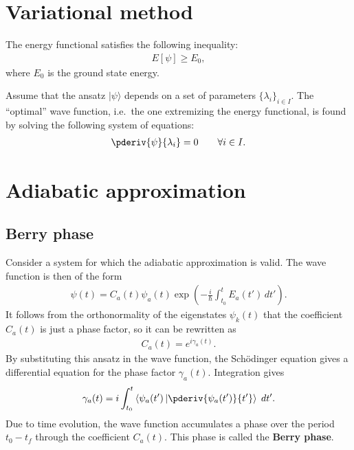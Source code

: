 \section{Variational method}


    \begin{property}
        The energy functional satisfies the following inequality:
        \begin{gather}
            E[\psi]\geq E_0,
        \end{gather}
        where $E_0$ is the ground state energy.
    \end{property}

    \begin{method}
        Assume that the ansatz $|\psi\rangle$ depends on a set of parameters $\{\lambda_i\}_{i\in I}$. The ``optimal'' wave function, i.e.~the one extremizing the energy functional, is found by solving the following system of equations:
        \begin{gather}
            \pderiv{\psi}{\lambda_i} = 0\qquad\forall i\in I.
        \end{gather}
    \end{method}

\section{Adiabatic approximation}
\subsection{Berry phase}

    Consider a system for which the adiabatic approximation is valid. The wave function is then of the form
    \begin{gather}
        \psi(t) = C_a(t)\psi_a(t)\exp\left(-\frac{i}{\hbar}\int_{t_0}^tE_a(t')\,dt'\right).
    \end{gather}
    It follows from the orthonormality of the eigenstates $\psi_k(t)$ that the coefficient $C_a(t)$ is just a phase factor, so it can be rewritten as
    \begin{gather}
        C_a(t) = e^{i\gamma_a(t)}.
    \end{gather}
    By substituting this ansatz in the wave function, the Sch\"odinger equation gives a differential equation for the phase factor $\gamma_a(t)$. Integration gives
    \begin{gather}
        \label{perturbation:phase_factor}
        \gamma_a(t) = i\int_{t_0}^t\left\langle\psi_a(t')\left|\pderiv{\psi_a(t')}{t'}\right\rangle\right.\,dt'.
    \end{gather}
    Due to time evolution, the wave function accumulates a phase over the period $t_0-t_f$ through the coefficient $C_a(t)$. This phase is called the \textbf{Berry phase}.

